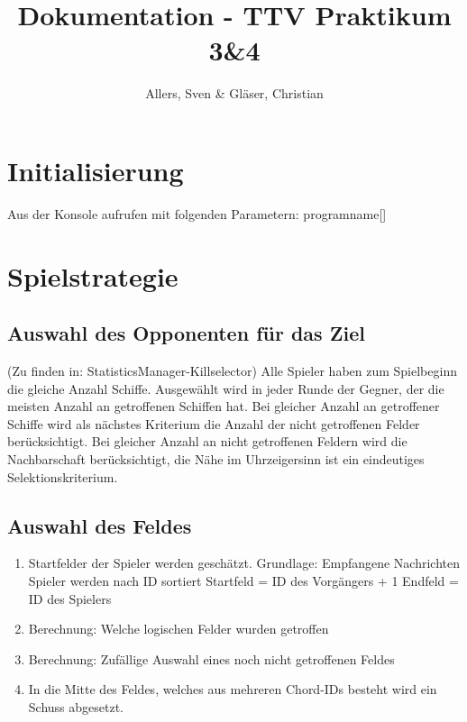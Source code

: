 \documentclass[a4paper]{article}
\title{Dokumentation - TTV Praktikum 3\&4}
\author{Allers, Sven \& Gläser, Christian}
\begin{document}
\maketitle

\begin{abstract}

\end{abstract}

\section{Initialisierung}
Aus der Konsole aufrufen mit folgenden Parametern:
programname[]

\section{Spielstrategie}
\subsection{Auswahl des Opponenten für das Ziel}
(Zu finden in: StatisticsManager-Killselector)\newline
Alle Spieler haben zum Spielbeginn die gleiche Anzahl Schiffe. \newline
Ausgewählt wird in jeder Runde der Gegner, der die meisten Anzahl an getroffenen Schiffen hat.\newline
Bei gleicher Anzahl an getroffener Schiffe wird als nächstes Kriterium die Anzahl der nicht getroffenen Felder berücksichtigt.\newline
Bei gleicher Anzahl an nicht getroffenen Feldern wird die Nachbarschaft berücksichtigt, die Nähe im Uhrzeigersinn ist ein eindeutiges Selektionskriterium.
\subsection{Auswahl des Feldes}
\begin{enumerate}
	\item Startfelder der Spieler werden geschätzt. Grundlage: Empfangene Nachrichten
		\subitem Spieler werden nach ID sortiert
		\subitem Startfeld = ID des Vorgängers + 1
		\subitem Endfeld = ID des Spielers
	\item Berechnung: Welche logischen Felder wurden getroffen
	\item Berechnung: Zufällige Auswahl eines noch nicht getroffenen Feldes
	\item In die Mitte des Feldes, welches aus mehreren Chord-IDs besteht wird ein Schuss abgesetzt.
\end{enumerate}
\end{document}

